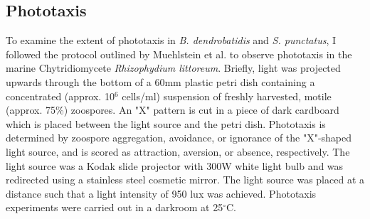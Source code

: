 \subsection*{Phototaxis}
To examine the extent of phototaxis in \textit{B. dendrobatidis} and \textit{S. punctatus}, I followed the protocol outlined by Muehlstein et al.\nocite{Muehlstein1987} to observe phototaxis in the marine Chytridiomycete \textit{Rhizophydium littoreum}. Briefly, light was projected upwards through the bottom of a 60mm plastic petri dish containing a concentrated (approx. 10$^{6}$ cells/ml) suspension of freshly harvested, motile (approx. 75\%) zoospores. An "X" pattern is cut in a piece of dark cardboard which is placed between the light source and the petri dish. Phototaxis is determined by zoospore aggregation, avoidance, or ignorance of the "X"-shaped light source, and is scored as attraction, aversion, or absence, respectively. The light source was a Kodak slide projector with 300W white light bulb and was redirected using a stainless steel cosmetic mirror. The light source was placed at a distance such that a light intensity of 950 lux was achieved. Phototaxis experiments were carried out in a darkroom at 25$^{\circ}$C.\\ 
